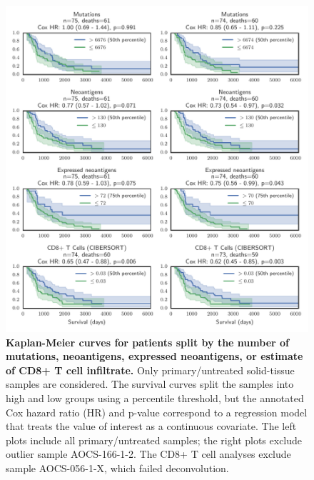 \documentclass{article}
\begin{document}
\begin{figure}[htbp]
\centering
\includegraphics[scale=1.0]{../figures/survival.pdf}
\caption{\textbf{Kaplan-Meier curves for patients split by the number of mutations, neoantigens, expressed neoantigens, or estimate of CD8+ T cell infiltrate.} Only primary/untreated solid-tissue samples are considered. The survival curves split the samples into high and low groups using a percentile threshold, but the annotated Cox hazard ratio (HR) and p-value correspond to a regression model that treats the value of interest as a continuous covariate. The left plots include all primary/untreated samples; the right plots exclude outlier sample AOCS-166-1-2. The CD8+ T cell analyses exclude sample AOCS-056-1-X, which failed deconvolution.}
\label{fig:survival}
\end{figure}
\end{document}

